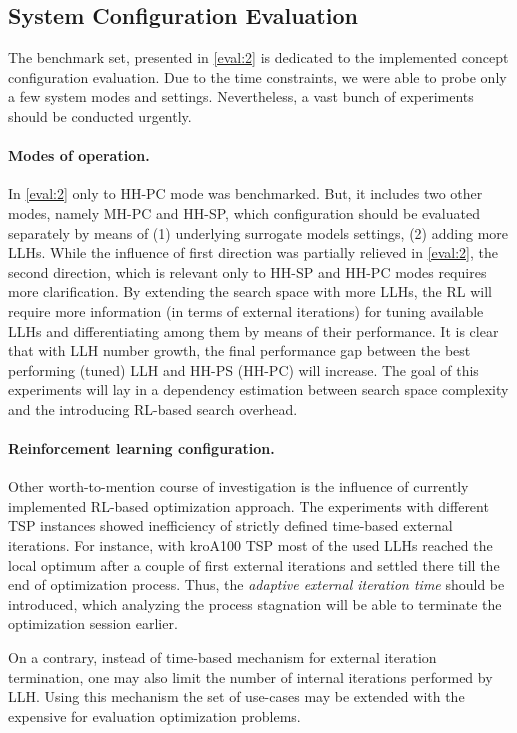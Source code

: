 \subsection{System Configuration Evaluation}
The benchmark set, presented in \cref{eval:2} is dedicated to the implemented concept configuration evaluation. Due to the time constraints, we were able to probe only a few system modes and settings. Nevertheless, a vast bunch of experiments should be conducted urgently.

\paragraph{Modes of operation.} In \cref{eval:2} only to HH-PC mode was benchmarked. But, it includes two other modes, namely MH-PC and HH-SP, which configuration should be evaluated separately by means of (1) underlying surrogate models settings, (2) adding more LLHs. While the influence of first direction was partially relieved in \cref{eval:2}, the second direction, which is relevant only to HH-SP and HH-PC modes requires more clarification. By extending the search space with more LLHs, the RL will require more information (in terms of external iterations) for tuning available LLHs and differentiating among them by means of their performance. It is clear that with LLH number growth, the final performance gap between the best performing (tuned) LLH and HH-PS (HH-PC) will increase. The goal of this experiments will lay in a dependency estimation between search space complexity and the introducing RL-based search overhead.

\paragraph{Reinforcement learning configuration.} Other worth-to-mention course of investigation is the influence of currently implemented RL-based optimization approach. The experiments with different TSP instances showed inefficiency of strictly defined time-based external iterations. For instance, with kroA100 TSP most of the used LLHs reached the local optimum after a couple of first external iterations and settled there till the end of optimization process. Thus, the \emph{adaptive external iteration time} should be introduced, which analyzing the process stagnation will be able to terminate the optimization session earlier. 

On a contrary, instead of time-based mechanism for external iteration termination, one may also limit the number of internal iterations performed by LLH. Using this mechanism the set of use-cases may be extended with the expensive for evaluation optimization problems.